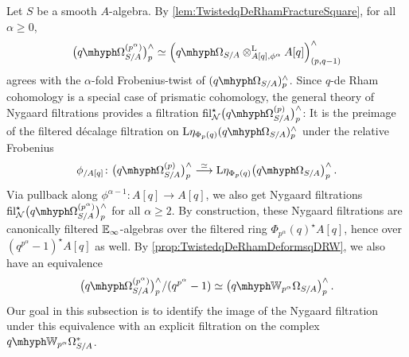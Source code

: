 \documentclass[DIV=12,numbers=enddot,leqno,bibliography=totoc]{scrartcl}
\begin{document}
	\begin{numpar}\label{par:NygaardOnqDeRham}
		Let $S$ be a smooth $A$-algebra. By \cref{lem:TwistedqDeRhamFractureSquare}, for all $\alpha\geqslant 0$,
		\begin{equation*}
			\bigl(\qOmega_{S/A}^{(p^\alpha)}\bigr)_p^\complete\simeq\left(\qOmega_{S/A}\lotimes_{A[q],\phi^\alpha}A[q]\right)_{(p,q-1)}^\complete
		\end{equation*}
		agrees with the $\alpha$-fold Frobenius-twist of $(\qOmega_{S/A})_p^\complete$. %
		Since $q$-de Rham cohomology is a special case of prismatic cohomology, the general theory of Nygaard filtrations \cite[\S{}]{Prismatic} provides a filtration $ \fil_\Nn^\star \bigl(\qOmega_{S/A}^{(p)}\bigr)_p^\complete$: It is the preimage of the filtered décalage filtration on $\L\eta_{\Phi_p(q)}(\qOmega_{S/A})_p^\complete$ under the relative Frobenius
		\begin{equation*}
			\phi_{/A[q]}\colon \bigl(\qOmega_{S/A}^{(p)}\bigr)_p^\complete\overset{\simeq}{\longrightarrow}\L\eta_{\Phi_p(q)}\left(\qOmega_{S/A}\right)_p^\complete\,.
		\end{equation*}
		Via pullback along $\phi^{\alpha-1}\colon A[q]\rightarrow A[q]$, we also get Nygaard filtrations $ \fil_\Nn^\star \bigl(\qOmega_{S/A}^{(p^\alpha)}\bigr)_p^\complete$ for all $\alpha\geqslant 2$. By construction, these Nygaard filtrations are canonically filtered $\mathbb{E}_\infty$-algebras over the filtered ring $\Phi_{p^\alpha}(q)^\star A[q]$, hence over $(q^{p^\alpha}-1)^\star A[q]$ as well. By \cref{prop:TwistedqDeRhamDeformsqDRW}, we also have an equivalence
		\begin{equation*}
			\bigl(\qOmega_{S/A}^{(p^\alpha)}\bigr)_p^\complete/(q^{p^\alpha}-1)\simeq \left(\qIW_{p^\alpha}\Omega_{S/A}\right)_p^\complete\,.
		\end{equation*}
		Our goal in this subsection is to identify the image of the Nygaard filtration under this equivalence with an explicit filtration on the complex $\qIW_{p^\alpha}\Omega_{S/A}^*$.
	\end{numpar}
	
\end{document}
